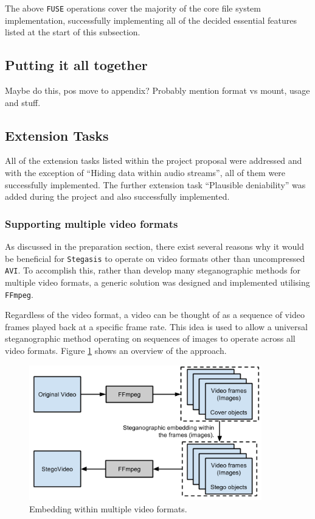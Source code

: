 \documentclass[paper=a4, fontsize=11pt,twoside]{scrartcl}    %
\numberwithin{table}{section}
\numberwithin{figure}{section}
\numberwithin{algorithm}{section}
\begin{document}
\noindent
The above \texttt{FUSE} operations cover the majority of the core file system implementation, successfully implementing all of the decided essential features listed at the start of this subsection.

\subsection{Putting it all together}

Maybe do this, pos move to appendix? Probably mention format vs mount, usage and stuff.

\subsection{Extension Tasks}

All of the extension tasks listed within the project proposal were addressed and with the exception of ``Hiding data within audio streams'', all of them were successfully implemented. The further extension task ``Plausible deniability'' was added during the project and also successfully implemented.

\subsubsection{Supporting multiple video formats}
\label{extffmpeg}

As discussed in the preparation section, there exist several reasons why it would be beneficial for \texttt{Stegasis} to operate on video formats other than uncompressed \texttt{AVI}. To accomplish this, rather than develop many steganographic methods for multiple video formats, a generic solution was designed and implemented utilising \texttt{FFmpeg}.

Regardless of the video format, a video can be thought of as a sequence of video frames played back at a specific frame rate. This idea is used to allow a universal steganographic method operating on sequences of images to operate across all video formats. Figure \ref{multi} shows an overview of the approach.

\begin{figure}[here]
\centerline{\includegraphics[width=0.9\textwidth]{images/multi.png}}
\caption{Embedding within multiple video formats.}
\label{multi}
\end{figure}
\end{document}
